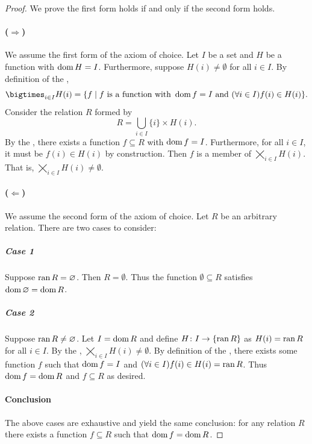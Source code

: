 \documentclass{report}
\begin{document}
\begin{proof}

  We prove the first form holds if and only if the second form holds.

  \paragraph{($\Rightarrow$)}%

    We assume the first form of the axiom of choice.
    Let $I$ be a set and $H$ be a function with $\mathop{\text{dom}}{H} = I$.
    Furthermore, suppose $H(i) \neq \emptyset$ for all $i \in I$.
    By definition of the ,
      $$\bigtimes_{i \in I} H(i) = \{f \mid
        f \text{ is a function with } \dom{f} = I \text{ and }
          (\forall i \in I) f(i) \in H(i)\}.$$
    Consider the relation $R$ formed by
      $$R = \bigcup_{i \in I} \{i\} \times H(i).$$
    By the , there exists a function
      $f \subseteq R$ with $\mathop{\text{dom}}{f} = I$.
    Furthermore, for all $i \in I$, it must be $f(i) \in H(i)$ by construction.
    Then $f$ is a member of $\bigtimes_{i \in I} H(i)$.
    That is, $\bigtimes_{i \in I} H(i) \neq \emptyset$.

  \paragraph{($\Leftarrow$)}%

    We assume the second form of the axiom of choice.
    Let $R$ be an arbitrary relation.
    There are two cases to consider:

    \subparagraph{Case 1}%

      Suppose $\mathop{\text{ran}}{R} = \varnothing$.
      Then $R = \emptyset$.
      Thus the function $\emptyset \subseteq R$ satisfies
        $\mathop{\text{dom}}{\varnothing} = \mathop{\text{dom}}{R}$.

    \subparagraph{Case 2}%

      Suppose $\mathop{\text{ran}}{R} \neq \varnothing$.
      Let $I = \mathop{\text{dom}}{R}$ and define $H \colon I \rightarrow \{\mathop{\text{ran}}{R}\}$ as
        $H(i) = \mathop{\text{ran}}{R}$ for all $i \in I$.
      By the ,
        $\bigtimes_{i \in I} H(i) \neq \emptyset$.
      By definition of the , there exists some
        function $f$ such that $\mathop{\text{dom}}{f} = I$ and
        $(\forall i \in I) f(i) \in H(i) = \mathop{\text{ran}}{R}$.
      Thus $\mathop{\text{dom}}{f} = \mathop{\text{dom}}{R}$ and $f \subseteq R$ as desired.

    \paragraph{Conclusion}%

      The above cases are exhaustive and yield the same conclusion: for any
        relation $R$ there exists a function $f \subseteq R$ such that
        $\mathop{\text{dom}}{f} = \mathop{\text{dom}}{R}$.

\end{proof}
\end{document}
